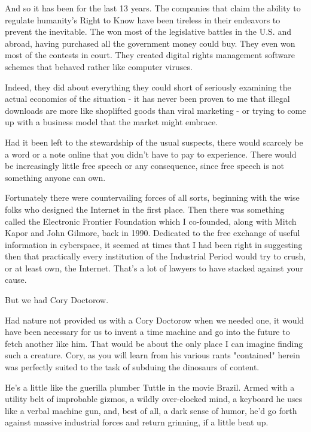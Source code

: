 And so it has been for the last 13 years. The companies that claim
the ability to regulate humanity's Right to Know have been tireless
in their endeavors to prevent the inevitable. The won most of the
legislative battles in the U.S. and abroad, having purchased all
the government money could buy. They even won most of the contests
in court. They created digital rights management software schemes
that behaved rather like computer viruses.

Indeed, they did about everything they could short of seriously
examining the actual economics of the situation - it has never been
proven to me that illegal downloads are more like shoplifted goods
than viral marketing - or trying to come up with a business model
that the market might embrace.

Had it been left to the stewardship of the usual suspects, there
would scarcely be a word or a note online that you didn't have to
pay to experience. There would be increasingly little free speech
or any consequence, since free speech is not something anyone can
own.

Fortunately there were countervailing forces of all sorts,
beginning with the wise folks who designed the Internet in the
first place. Then there was something called the Electronic
Frontier Foundation which I co-founded, along with Mitch Kapor and
John Gilmore, back in 1990. Dedicated to the free exchange of
useful information in cyberspace, it seemed at times that I had
been right in suggesting then that practically every institution of
the Industrial Period would try to crush, or at least own, the
Internet. That's a lot of lawyers to have stacked against your
cause.

But we had Cory Doctorow.

Had nature not provided us with a Cory Doctorow when we needed one,
it would have been necessary for us to invent a time machine and go
into the future to fetch another like him. That would be about the
only place I can imagine finding such a creature. Cory, as you will
learn from his various rants "contained" herein was perfectly
suited to the task of subduing the dinosaurs of content.

He's a little like the guerilla plumber Tuttle in the movie Brazil.
Armed with a utility belt of improbable gizmos, a wildly
over-clocked mind, a keyboard he uses like a verbal machine gun,
and, best of all, a dark sense of humor, he'd go forth against
massive industrial forces and return grinning, if a little beat
up.

